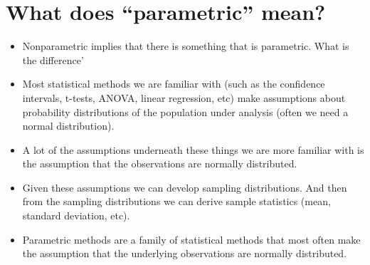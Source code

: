 \section{What does ``parametric'' mean?}
\begin{itemize}
    \item Nonparametric implies that there is something that is parametric. What is the difference'
    \item Most statistical methods we are familiar with (such as the confidence intervals, t-tests, ANOVA, linear regression, etc) make assumptions about probability distributions of the population under analysis (often we need a normal distribution).
    \item A lot of the assumptions underneath these things we are more familiar with is the assumption that the observations are normally distributed. 
    \item Given these assumptions we can develop sampling distributions. And then from the sampling distributions we can derive sample statistics (mean, standard deviation, etc).
    \item Parametric methods are a family of statistical methods that most often make the assumption that the underlying observations are normally distributed. 
\end{itemize}

